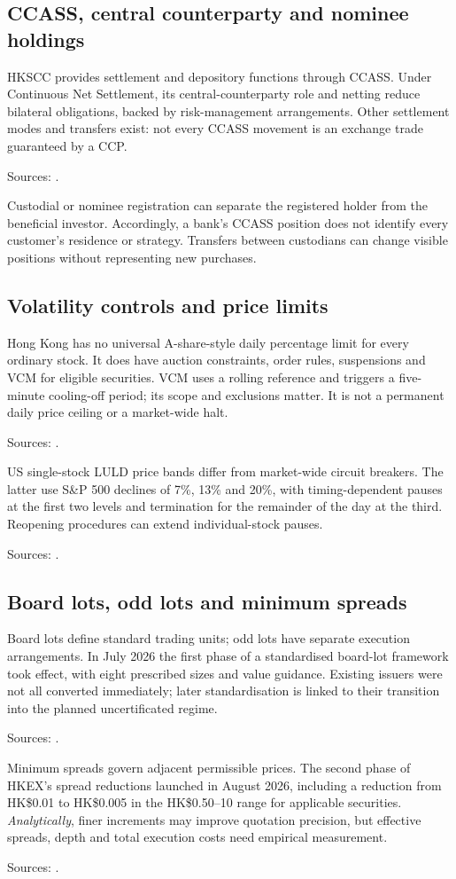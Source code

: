 \documentclass[11pt,a4paper]{article}
\newcommand{\source}[1]{\par{\footnotesize\color{ink}Sources: \cite{#1}.}\par}
\begin{document}
\subsection{CCASS, central counterparty and nominee holdings}
HKSCC provides settlement and depository functions through CCASS. Under Continuous Net Settlement, its central-counterparty role and netting reduce bilateral obligations, backed by risk-management arrangements. Other settlement modes and transfers exist: not every CCASS movement is an exchange trade guaranteed by a CCP.\source{ccass}

Custodial or nominee registration can separate the registered holder from the beneficial investor. Accordingly, a bank's CCASS position does not identify every customer's residence or strategy. Transfers between custodians can change visible positions without representing new purchases.

\subsection{Volatility controls and price limits}
Hong Kong has no universal A-share-style daily percentage limit for every ordinary stock. It does have auction constraints, order rules, suspensions and VCM for eligible securities. VCM uses a rolling reference and triggers a five-minute cooling-off period; its scope and exclusions matter. It is not a permanent daily price ceiling or a market-wide halt.\source{vcm}

US single-stock LULD price bands differ from market-wide circuit breakers. The latter use S\&P 500 declines of 7\%, 13\% and 20\%, with timing-dependent pauses at the first two levels and termination for the remainder of the day at the third. Reopening procedures can extend individual-stock pauses.\source{luld,mwcb}

\subsection{Board lots, odd lots and minimum spreads}
Board lots define standard trading units; odd lots have separate execution arrangements. In July 2026 the first phase of a standardised board-lot framework took effect, with eight prescribed sizes and value guidance. Existing issuers were not all converted immediately; later standardisation is linked to their transition into the planned uncertificated regime.\source{lot2026}

Minimum spreads govern adjacent permissible prices. The second phase of HKEX's spread reductions launched in August 2026, including a reduction from HK\$0.01 to HK\$0.005 in the HK\$0.50--10 range for applicable securities. \textit{Analytically}, finer increments may improve quotation precision, but effective spreads, depth and total execution costs need empirical measurement.\source{tick2026}
\end{document}
